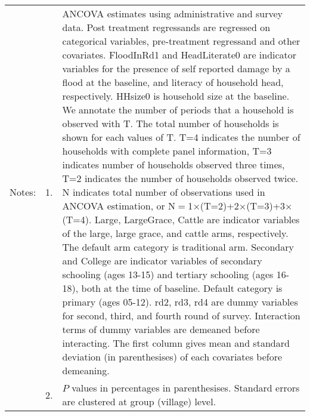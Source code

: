 \begin{minipage}[t]{14cm}
\begin{tabular}{>{\hfill\scriptsize}p{1cm}<{}>{\hfill\scriptsize}p{.25cm}<{}>{\scriptsize}p{14cm}<{\hfill}}
Notes: & 1. & ANCOVA estimates using administrative and survey data. Post treatment regressands are regressed on categorical variables, pre-treatment regressand and other covariates. \textsf{FloodInRd1} and \textsf{HeadLiterate0} are indicator variables for the presence of self reported damage by a flood at the baseline, and literacy of household head, respectively. \textsf{HHsize0} is household size at the baseline. We annotate the number of periods that a household is observed with \textsf{T}. The total number of households is shown for each values of \textsf{T}. \textsf{T=4} indicates the number of households with complete panel information, \textsf{T=3} indicates number of households observed three times, \textsf{T=2} indicates the number of households observed twice. \textsf{N} indicates total number of observations used in ANCOVA estimation, or \textsf{N$=$1$\times$(T=2)+2$\times$(T=3)+3$\times$(T=4)}.  \textsf{Large}, \textsf{LargeGrace}, \textsf{Cattle} are indicator variables of the \textsf{large}, \textsf{large grace}, and \textsf{cattle} arms, respectively. The default arm category is \textsf{traditional} arm. \textsf{Secondary} and \textsf{College} are indicator variables of secondary schooling (ages 13-15) and tertiary schooling (ages 16-18), both at the time of baseline. Default category is primary (ages 05-12). \textsf{rd2, rd3, rd4} are dummy variables for second, third, and fourth round of survey. Interaction terms of dummy variables are demeaned before interacting. The first column gives mean and standard deviation (in parenthesises) of each covariates before demeaning.\\
& 2. & $P$ values in percentages in parenthesises. Standard errors are clustered at group (village) level.%
\end{tabular}
\end{minipage}

